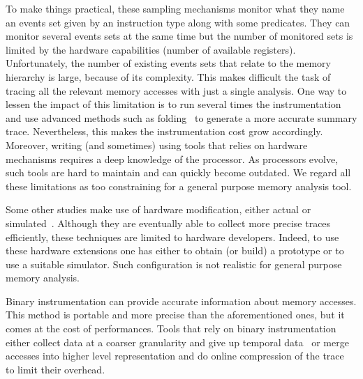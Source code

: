 To make things practical, these sampling mechanisms monitor what they name an events set given by an instruction type along with some predicates.
They can monitor several events sets at the same time but the number of monitored sets is limited by the hardware capabilities (number of available
registers). Unfortunately, the number of existing events sets that relate to the memory hierarchy is large, because of its complexity.
This makes difficult the task of tracing all the relevant memory accesses with just a single analysis.
One way to lessen the impact of this limitation is to run several times the
instrumentation and use advanced methods such as
folding~\cite{Servat15Towards} to generate a more accurate summary trace.
Nevertheless, this makes the instrumentation cost grow accordingly.
Moreover, writing (and sometimes) using tools that relies on hardware mechanisms
requires a deep knowledge of the processor. As processors evolve,
such tools are hard to maintain and can quickly become outdated.
We regard all these limitations as too constraining for a general purpose
memory analysis tool.

Some other studies make use of hardware modification, either actual or
simulated~\cite{Bao08HMTT,Martonosi92MemSpy}.  Although they are eventually able to collect
more precise traces efficiently, these techniques are limited to hardware
developers. Indeed, to use these hardware extensions one has either to obtain (or build) a
prototype or to use a suitable simulator. Such configuration is not realistic
for general purpose memory analysis.

Binary instrumentation can provide accurate information about memory accesses.
This method is portable and  more precise than the aforementioned ones,
but it comes at the cost of performances. 
Tools that rely on binary instrumentation either collect data at a coarser
granularity and give up temporal data~\cite{Beniamine15TABARNAC} or merge
accesses into higher level representation and do online compression of the
trace~\cite{Budanur11Memory} to limit their overhead.


